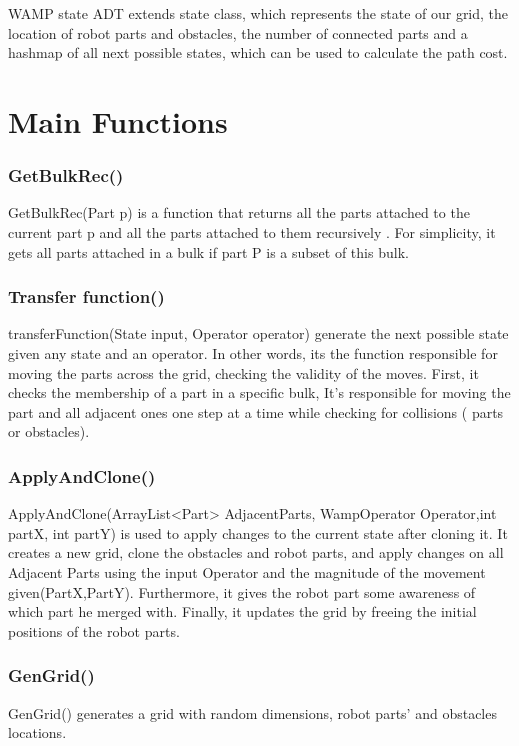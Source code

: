 WAMP state ADT extends state class, which represents the state of our grid, the location of robot parts and obstacles, the number of connected parts and a hashmap of all next possible states, which can be used to calculate the path cost. 
\newpage

\section{Main Functions}
\subsubsection{GetBulkRec()}
GetBulkRec(Part p) is a function that returns all the parts attached to the current part p and all the parts attached to them recursively . For simplicity, it gets all parts attached in a bulk if part P is a subset of this bulk. 



\subsubsection{Transfer function()}
transferFunction(State input, Operator operator) generate the next possible state given any state and an operator. In other words, its the function responsible for moving the parts across the grid, checking the validity of the moves. First, it checks the membership of a part in a specific bulk, It's responsible for moving the part and all adjacent ones one step at a time while checking for collisions ( parts or obstacles).

\subsubsection{ApplyAndClone()}
ApplyAndClone(ArrayList<Part> AdjacentParts, WampOperator Operator,int partX, int partY) is used to apply changes to the current state after cloning it. It creates a new grid, clone the obstacles and robot parts, and apply changes on all Adjacent Parts using the input Operator and the magnitude of the movement given(PartX,PartY). Furthermore, it gives the robot part some awareness of which part he merged with. Finally, it updates the grid by freeing the initial positions of the robot parts.

\subsubsection{GenGrid()}
GenGrid() generates a grid with random dimensions, robot parts' and obstacles locations.

